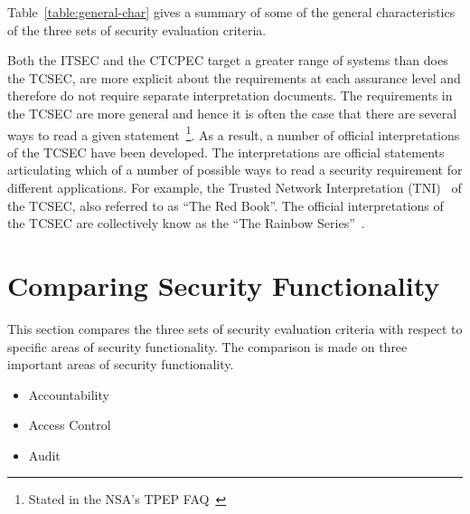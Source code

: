     Table~\ref{table:general-char} gives a summary of some of the general
    characteristics of the three sets of security evaluation criteria.

    Both the ITSEC and the CTCPEC target a greater range of systems than does the TCSEC, are more explicit
    about the requirements at each assurance level and therefore do not require separate interpretation
    documents. The requirements in the TCSEC are more general and hence it is often the case that
    there are several ways to read a given statement~\footnote{Stated in the NSA's TPEP FAQ~\cite{tpepfaq}}.
    As a result, a number of official interpretations of the TCSEC have been developed.
    The interpretations are official statements articulating which of a number of possible ways to
    read a security requirement for different applications. For example, the Trusted Network Interpretation
    (TNI)~\cite{redbook} of the TCSEC, also referred to as ``The Red Book''.
    The official interpretations of the TCSEC are collectively know as the ``The Rainbow Series''~\cite{rainbow}.
 



\section{Comparing Security Functionality} 
This section compares the three sets of security evaluation criteria with 
respect to specific areas of security functionality.
The comparison is made on three important areas of security functionality. 
    \begin{itemize}
        \item Accountability
        \item Access Control
        \item Audit
    \end{itemize}

\newcommand{\heading}[1]{\multicolumn{2}{|c|}{\bfseries\sffamily{#1}} \\ \hline}
\newcommand{\bc}{\begin{tabular}{|>{\sffamily}p{2cm}|>{\sffamily}p{11cm}|} \hline}
\newcommand{\ec}{\end{tabular}}
\newcommand{\approach}[1]{Approach & #1 \\ \hline}
\newcommand{\levels}[1]{Levels & #1 \\ \hline}
\newcommand{\type}[1]{Criteria Type & #1 \\ \hline}

